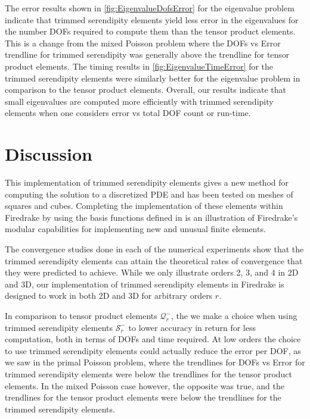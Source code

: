\documentclass[format=acmsmall,screen,timestamp=false,a4paper]{acmart}
\newcommand{\calQ}{\mathcal{Q}}
\newcommand{\calS}{\mathcal{S}}
\begin{document}
The error results shown in \cref{fig:EigenvalueDofsError} for the eigenvalue problem indicate that trimmed serendipity elements yield less error in the eigenvalues for the number DOFs required to compute them than the tensor product elements.  This is a change from the mixed Poisson problem where the DOFs vs Error trendline for trimmed serendipity was generally above the trendline for tensor product elements.  %
The timing results in \ref{fig:EigenvalueTimeError} for the trimmed serendipity elements were similarly better for the eigenvalue problem in comparison to the tensor product elements. 
Overall, our results indicate that small eigenvalues are computed more efficiently with trimmed serendipity elements when one considers error vs total DOF count or run-time.


\section{Discussion}

This implementation of trimmed serendipity elements gives a new method for computing the solution to a discretized PDE and has been tested on meshes of squares and cubes.  Completing the implementation of these elements within Firedrake by using the basis functions defined in \citet{gillette2019computational} is an illustration of Firedrake's modular capabilities for implementing new and unusual finite elements. 

The convergence studies done in each of the numerical experiments show that the trimmed serendipity elements can attain the theoretical rates of convergence that they were predicted to achieve.  While we only illustrate orders 2, 3, and 4 in 2D and 3D, our implementation of trimmed serendipity elements in Firedrake is designed to work in both 2D and 3D for arbitrary orders $r$.  

In comparison to tensor product elements $\mathcal{Q}^-_r$, the we make a choice when using trimmed serendipity elements $\mathcal{S}^-_r$ to lower accuracy in return for less computation, both in terms of DOFs and time required.  At low orders the choice to use trimmed serendipity elements could actually reduce the error per DOF, as we saw in the primal Poisson problem, where the trendlines for DOFs vs Error for trimmed serendipity elements were below the trendlines for the tensor product elements.  In the mixed Poisson case however, the opposite was true, and the trendlines for the tensor product elements were below the trendlines for the trimmed serendipity elements.
\end{document}
